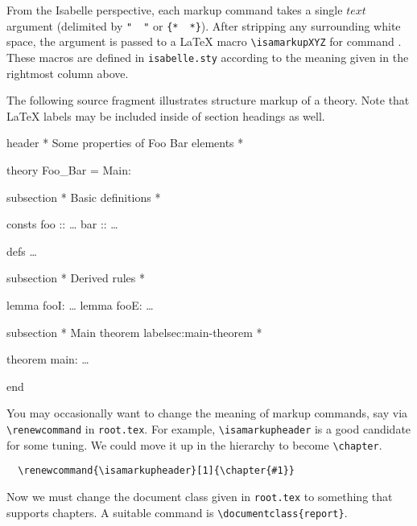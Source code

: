 \begin{isabellebody}
\begin{isamarkuptext}
  From the Isabelle perspective, each markup command takes a single
  $text$ argument (delimited by \verb,",~\isa{{\isasymdots}}~\verb,", or
  \verb,{,\verb,*,~\isa{{\isasymdots}}~\verb,*,\verb,},).  After stripping any
  surrounding white space, the argument is passed to a {\LaTeX} macro
  \verb,\isamarkupXYZ, for command .  These macros are
  defined in \verb,isabelle.sty, according to the meaning given in the
  rightmost column above.

  \medskip The following source fragment illustrates structure markup
  of a theory.  Note that {\LaTeX} labels may be included inside of
  section headings as well.

  \begin{ttbox}
  header {\ttlbrace}* Some properties of Foo Bar elements *{\ttrbrace}

  theory Foo_Bar = Main:

  subsection {\ttlbrace}* Basic definitions *{\ttrbrace}

  consts
    foo :: \dots
    bar :: \dots

  defs \dots

  subsection {\ttlbrace}* Derived rules *{\ttrbrace}

  lemma fooI: \dots
  lemma fooE: \dots

  subsection {\ttlbrace}* Main theorem {\ttback}label{\ttlbrace}sec:main-theorem{\ttrbrace} *{\ttrbrace}

  theorem main: \dots

  end
  \end{ttbox}\vspace{-\medskipamount}

  You may occasionally want to change the meaning of markup commands,
  say via \verb,\renewcommand, in \texttt{root.tex}.  For example,
  \verb,\isamarkupheader, is a good candidate for some tuning.  We
  could move it up in the hierarchy to become \verb,\chapter,.

\begin{verbatim}
  \renewcommand{\isamarkupheader}[1]{\chapter{#1}}
\end{verbatim}

  \noindent Now we must change the document class given in
  \texttt{root.tex} to something that supports chapters.  A suitable
  command is \verb,\documentclass{report},.


\end{isamarkuptext}
\end{isabellebody}
